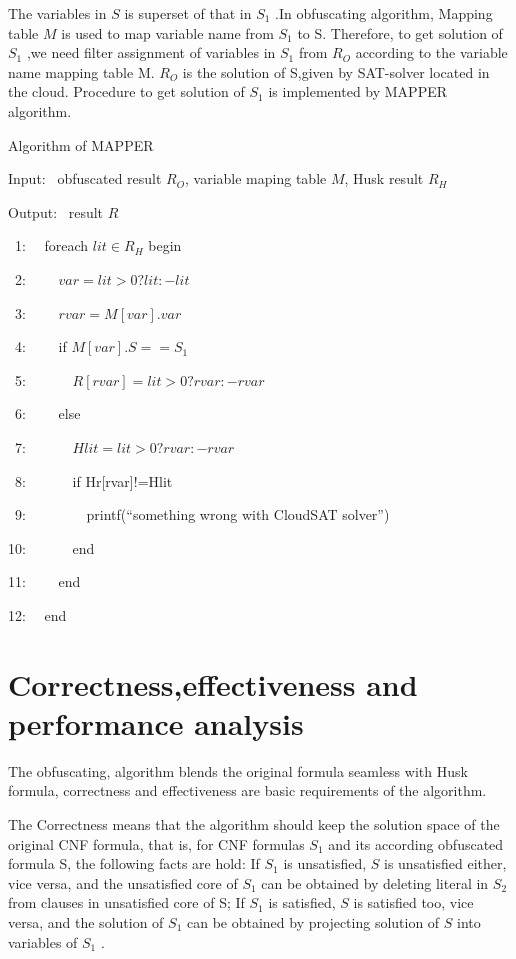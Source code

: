 \documentclass[runningheads,a4paper]{llncs}
\begin{document}
The variables in $S$ is superset of that in $S_1$ .In obfuscating algorithm, Mapping table $M$ is used to map variable name from $S_1$  to S. 
Therefore, to get solution of $S_1$  ,we need filter assignment of variables in $S_1$  from  $R_O$  according to the variable name mapping table M.  
$R_O$  is the solution of S,given by SAT-solver located in the cloud. Procedure to get solution of $S_1$  is implemented by MAPPER algorithm.

\noindent Algorithm of MAPPER

Input:~ obfuscated result $R_O$, variable maping table $M$, Husk result $R_H$

Output:~ result $R$

~1:~~ foreach $lit \in R_H$ begin

~2:~~~~   $var=lit>0?lit:-lit$

~3:~~~~   $rvar=M[var].var$

~4:~~~~   if $M[var].S==S_1$

~5:~~~~~~       $R[rvar]=lit>0?rvar:-rvar$ 

~6:~~~~   else    

~7:~~~~~~       $Hlit=lit>0?rvar:-rvar$

~8:~~~~~~       if Hr[rvar]!=Hlit

~9:~~~~~~~~       printf(“something wrong with CloudSAT solver”)

10:~~~~~~       end

11:~~~~   end

12:~~  end

\section{Correctness,effectiveness and performance analysis}

The obfuscating, algorithm blends the original formula seamless with Husk formula, correctness and effectiveness are basic requirements of the algorithm. 

The Correctness means that the algorithm should keep the solution space of the original CNF formula, that is, for CNF formulas $S_1$  and its according obfuscated formula S, 
the following facts are hold: If $S_1$  is unsatisfied, $S$ is unsatisfied either, vice versa, and the unsatisfied core of $S_1$  can be obtained by deleting literal in $S_2$  from clauses in unsatisfied core of S;
If $S_1$  is satisfied, $S$ is satisfied too, vice versa, and the solution of $S_1$  can be obtained by projecting solution of $S$ into variables of $S_1$ . 
\end{document}
